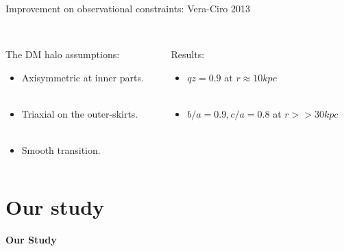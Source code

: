 \documentclass[xcolor=dvipsnames]{beamer}
\begin{document}
\begin{frame}

Improvement on observational constraints: Vera-Ciro 2013\\~\\

\begin{columns}[c]

\begin{column}{.5\textwidth}
The DM halo assumptions:

\begin{itemize}
\item Axisymmetric at inner parts.\\~\\

\item Triaxial on the outer-skirts.\\~\\

\item Smooth transition.

\end{itemize}
\end{column}
\begin{column}{.5\textwidth}
Results:

\begin{itemize}
\item $qz = 0.9$ at $r \approx 10kpc$\\~\\

\item $b/a = 0.9, c/a = 0.8$ at $r>>30kpc$\\~\\

\end{itemize}
\end{column}

\end{columns}

\end{frame}

\section{Our study}
\begin{frame}
\centering
\Huge
\textbf{Our Study}
\normalsize
\end{frame}
\end{document}
